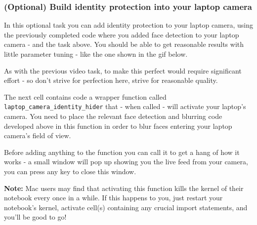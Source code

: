 \documentclass[11pt]{article}
\begin{document}
    \hypertarget{optional-build-identity-protection-into-your-laptop-camera}{%
\subsubsection{(Optional) Build identity protection into your laptop
camera}\label{optional-build-identity-protection-into-your-laptop-camera}}

In this optional task you can add identity protection to your laptop
camera, using the previously completed code where you added face
detection to your laptop camera - and the task above. You should be able
to get reasonable results with little parameter tuning - like the one
shown in the gif below.

As with the previous video task, to make this perfect would require
significant effort - so don't strive for perfection here, strive for
reasonable quality.

The next cell contains code a wrapper function called
\texttt{laptop\_camera\_identity\_hider} that - when called - will
activate your laptop's camera. You need to place the relevant face
detection and blurring code developed above in this function in order to
blur faces entering your laptop camera's field of view.

Before adding anything to the function you can call it to get a hang of
how it works - a small window will pop up showing you the live feed from
your camera, you can press any key to close this window.

\textbf{Note:} Mac users may find that activating this function kills
the kernel of their notebook every once in a while. If this happens to
you, just restart your notebook's kernel, activate cell(s) containing
any crucial import statements, and you'll be good to go!
\end{document}
